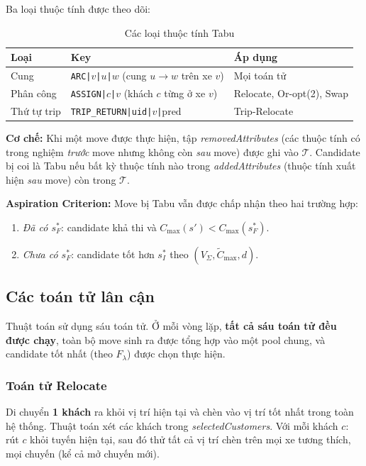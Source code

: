 \documentclass[../DoAn.tex]{subfiles}
\begin{document}
Ba loại thuộc tính được theo dõi:

\begin{table}[H]
\centering
\caption{Các loại thuộc tính Tabu}
\label{tab:tabu_attrs}
\begin{tabular}{lll}
\toprule
\textbf{Loại} & \textbf{Key} & \textbf{Áp dụng} \\
\midrule
Cung          & \texttt{ARC|$v$|$u$|$w$} (cung $u\!\to\!w$ trên xe $v$) & Mọi toán tử \\
Phân công     & \texttt{ASSIGN|$c$|$v$} (khách $c$ từng ở xe $v$)       & Relocate, Or-opt(2), Swap \\
Thứ tự trip   & \texttt{TRIP\_RETURN|uid|$v$|$\text{pred}$}              & Trip-Relocate \\
\bottomrule
\end{tabular}
\end{table}

\textbf{Cơ chế:} Khi một move được thực hiện, tập \textit{removedAttributes} (các thuộc tính có trong nghiệm \textit{trước} move nhưng không còn \textit{sau} move) được ghi vào $\mathcal{T}$. Candidate bị coi là Tabu nếu bất kỳ thuộc tính nào trong \textit{addedAttributes} (thuộc tính xuất hiện \textit{sau} move) còn trong $\mathcal{T}$.

\textbf{Aspiration Criterion:} Move bị Tabu vẫn được chấp nhận theo hai trường hợp:
\begin{enumerate}
    \item \textit{Đã có $s^*_F$}: candidate khả thi và $C_{\max}(s') < C_{\max}(s^*_F)$.
    \item \textit{Chưa có $s^*_F$}: candidate tốt hơn $s^*_I$ theo $(V_\Sigma, \tilde{C}_{\max}, d)$.
\end{enumerate}

\subsection{Các toán tử lân cận}

Thuật toán sử dụng sáu toán tử. Ở mỗi vòng lặp, \textbf{tất cả sáu toán tử đều được chạy}, toàn bộ move sinh ra được tổng hợp vào một pool chung, và candidate tốt nhất (theo $F_\lambda$) được chọn thực hiện.

\subsubsection{Toán tử Relocate}

Di chuyển \textbf{1 khách} ra khỏi vị trí hiện tại và chèn vào vị trí tốt nhất trong toàn hệ thống. Thuật toán xét các khách trong \textit{selectedCustomers}. Với mỗi khách $c$: rút $c$ khỏi tuyến hiện tại, sau đó thử tất cả vị trí chèn trên mọi xe tương thích, mọi chuyến (kể cả mở chuyến mới).
\end{document}
